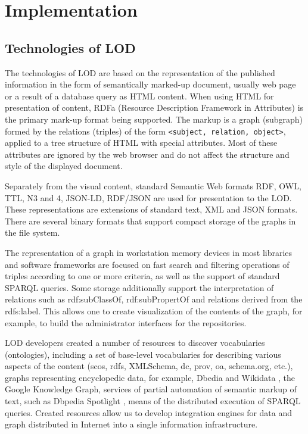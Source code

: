 \documentclass[12pt]{llncs}
\begin{document}
\section{Implementation}
\subsection{Technologies of LOD}

The technologies of LOD are based on the representation of the published
information in the form of semantically marked-up document, usually web
page or a result of a database query as HTML content. When using HTML
for presentation of content, RDFa (Resource Description Framework in
Attributes) is the primary mark-up format being supported. The markup is
a graph (subgraph) formed by the relations (triples) of the form
\texttt{<subject, relation, object>}, applied to a tree
structure of HTML with special attributes. Most of these attributes are
ignored by the web browser and do not affect the structure and style of
the displayed document.

Separately from the visual content, standard Semantic Web formats RDF,
OWL, TTL, N3 and 4, JSON-LD, RDF/JSON are used for presentation to the
LOD. These representations are extensions of standard text, XML and JSON
formats. There are several binary formats that support compact storage
of the graphs in the file system.

The representation of a graph in workstation memory devices in most
libraries and software frameworks are focused on fast search and
filtering operations of triples according to one or more criteria, as
well as the support of standard SPARQL queries. Some storage
additionally support the interpretation of relations such as
rdf:subClassOf, rdf:subPropertOf and relations derived from the
rdfs:label. This allows one to create visualization of the contents of
the graph, for example, to build the administrator interfaces for the
repositories.

LOD developers created a number of resources to discover vocabularies
(ontologies), including a set of base-level vocabularies for describing
various aspects of the content (scos, rdfs, XMLSchema, dc, prov, oa,
schema.org, etc.), graphs representing encyclopedic data, for example,
Dbedia \cite{b3} and Wikidata \cite{b4}, the Google Knowledge Graph,
services of partial automation of semantic markup of text, such as
Dbpedia Spotlight \cite{b5}, means of the distributed execution of SPARQL
queries. Created resources allow us to develop integration engines for
data and graph distributed in Internet into a single information
infrastructure.
\end{document}
